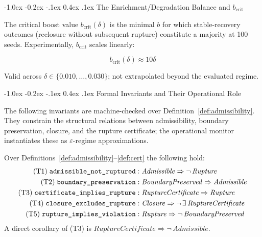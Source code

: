 \documentclass{llncs}
\makeatletter
\renewcommand\subsection{\@startsection{subsection}{2}{\z@}%
  {-1.0ex \@plus -0.2ex \@minus -.1ex}%
  {0.4ex \@plus .1ex}%
  {\normalfont\normalsize\bfseries}}
\makeatother
\begin{document}
\subsection{The Enrichment/Degradation Balance and $b_{\mathrm{crit}}$}

The critical boost value $b_{\mathrm{crit}}(\delta)$ is the minimal $b$
for which stable-recovery outcomes (reclosure without subsequent rupture)
constitute a majority at 100 seeds. Experimentally, $b_{\mathrm{crit}}$
scales linearly:

\begin{equation}
  b_{\mathrm{crit}}(\delta) \approx 10\delta
  \label{eq:bcrit}
\end{equation}

Valid across $\delta \in \{0.010, \ldots, 0.030\}$; not extrapolated
beyond the evaluated regime.

\subsection{Formal Invariants and Their Operational Role}
\label{sec:coq}

The following invariants are machine-checked over
Definition~\ref{def:admissibility}. They constrain the structural
relations between admissibility, boundary preservation, closure, and
the rupture certificate; the operational monitor instantiates these as
$\varepsilon$-regime approximations.

\begin{theorem}
\label{thm:coq}
\label{thm:anr}\label{lem:cir}\label{thm:cer}
Over Definitions~\ref{def:admissibility}--\ref{def:cert} the following
hold:
\begin{align*}
\textrm{(T1)\;}\texttt{admissible\_not\_ruptured}:\;
    &\mathit{Admissible} \Rightarrow \neg\,\mathit{Rupture} \\
\textrm{(T2)\;}\texttt{boundary\_preservation}:\;
    &\mathit{BoundaryPreserved} \Rightarrow \mathit{Admissible} \\
\textrm{(T3)\;}\texttt{certificate\_implies\_rupture}:\;
    &\mathit{RuptureCertificate} \Rightarrow \mathit{Rupture} \\
\textrm{(T4)\;}\texttt{closure\_excludes\_rupture}:\;
    &\mathit{Closure} \Rightarrow \neg\,\exists\,\mathit{RuptureCertificate} \\
\textrm{(T5)\;}\texttt{rupture\_implies\_violation}:\;
    &\mathit{Rupture} \Rightarrow \neg\,\mathit{BoundaryPreserved}
\end{align*}
A direct corollary of \textrm{(T3)} is $\mathit{RuptureCertificate}
\Rightarrow \neg\,\mathit{Admissible}$.
\end{theorem}
\end{document}

